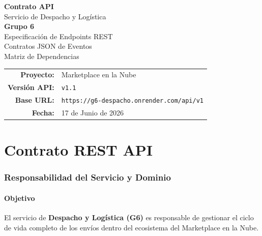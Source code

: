 \documentclass[11pt, a4paper]{article}
\begin{document}
\begin{titlepage}
\centering
\vspace*{2.5cm}

{\Huge\bfseries\textcolor{primary}{Contrato API}}\\[0.3cm]
{\LARGE\textcolor{primary!70}{Servicio de Despacho y Logística}}\\[0.5cm]
{\Large\textcolor{accent}{\textbf{Grupo 6}}}\\[2cm]

{\large Especificación de Endpoints REST}\\[0.2cm]
{\large Contratos JSON de Eventos}\\[0.2cm]
{\large Matriz de Dependencias}\\[3cm]

\begin{tabular}{rl}
  \textbf{Proyecto:}     & Marketplace en la Nube \\
  \textbf{Versión API:}  & \texttt{v1.1} \\
  \textbf{Base URL:}     & \texttt{https://g6-despacho.onrender.com/api/v1} \\
  \textbf{Fecha:}        & 17 de Junio de 2026 \\
\end{tabular}

\vfill



\end{titlepage}

\tableofcontents
\newpage


\part{Contrato REST API}

\section{Responsabilidad del Servicio y Dominio}

\subsection{Objetivo}

El servicio de \textbf{Despacho y Logística (G6)} es responsable de gestionar el ciclo de vida completo de los envíos dentro del ecosistema del Marketplace en la Nube.
\end{document}
